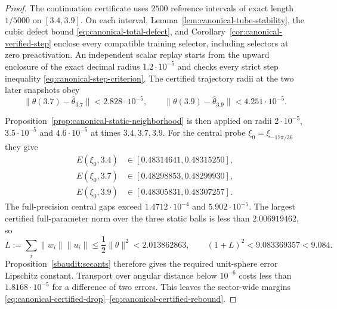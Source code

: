 \documentclass[10pt]{article}
\theoremstyle{remark}\newtheorem{remark}[theorem]{Remark}
\begin{document}
\begin{proof}
The continuation certificate uses $2500$ reference intervals of exact length
$1/5000$ on $[3.4,3.9]$. On each interval,
Lemma~\ref{lem:canonical-tube-stability}, the cubic defect bound
\eqref{eq:canonical-total-defect}, and
Corollary~\ref{cor:canonical-verified-step} enclose every compatible training
selector, including selectors at zero preactivation. An independent scalar
replay starts from the upward enclosure of the exact decimal radius
$1.2\cdot10^{-5}$ and checks every strict step inequality
\eqref{eq:canonical-step-criterion}. The certified trajectory radii at the two later snapshots obey
\[
 \|\theta(3.7)-\widehat\theta_{3.7}\|<2.828\cdot10^{-5},
 \qquad
 \|\theta(3.9)-\widehat\theta_{3.9}\|<4.251\cdot10^{-5}.
\]

Proposition~\ref{prop:canonical-static-neighborhood} is then applied on
radii $2\cdot10^{-5}$, $3.5\cdot10^{-5}$ and $4.6\cdot10^{-5}$ at times
$3.4,3.7,3.9$.
For the central probe $\xi_0=\xi_{-17\pi/36}$ they give
\begin{align*}
 E(\xi_0,3.4)&\in[0.48314641,0.48315250],\\
 E(\xi_0,3.7)&\in[0.48298853,0.48299930],\\
 E(\xi_0,3.9)&\in[0.48305831,0.48307257].
\end{align*}
The full-precision central gaps exceed $1.4712\cdot10^{-4}$ and
$5.902\cdot10^{-5}$. The largest certified full-parameter norm over the three
static balls is less than $2.006919462$, so
\[
 L:=\sum_i\|w_i\|\|u_i\|\le\frac12\|\theta\|^2
 <2.013862863,
 \qquad (1+L)^2<9.083369357<9.084.
\]
Proposition~\ref{sbaudit:secants} therefore gives the required unit-sphere
error Lipschitz constant. Transport over angular distance below $10^{-6}$
costs less than $1.8168\cdot10^{-5}$ for a difference of two errors. This leaves the sector-wide margins
\eqref{eq:canonical-certified-drop}--\eqref{eq:canonical-certified-rebound}.


\end{proof}
\end{document}
